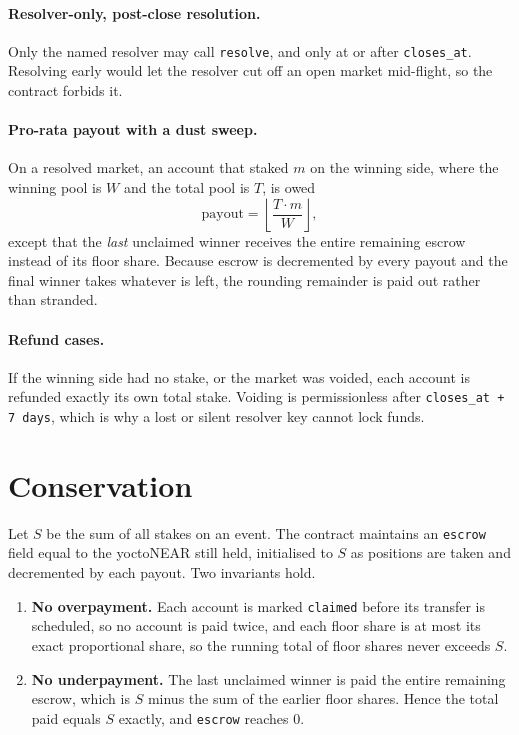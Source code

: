 \documentclass[11pt]{article}
\begin{document}
\paragraph{Resolver-only, post-close resolution.} Only the named resolver may
call \texttt{resolve}, and only at or after \texttt{closes\_at}. Resolving early
would let the resolver cut off an open market mid-flight, so the contract forbids
it.

\paragraph{Pro-rata payout with a dust sweep.} On a resolved market, an account
that staked $m$ on the winning side, where the winning pool is $W$ and the total
pool is $T$, is owed
\[
  \text{payout} = \left\lfloor \frac{T \cdot m}{W} \right\rfloor,
\]
except that the \emph{last} unclaimed winner receives the entire remaining
escrow instead of its floor share. Because escrow is decremented by every payout
and the final winner takes whatever is left, the rounding remainder is paid out
rather than stranded.

\paragraph{Refund cases.} If the winning side had no stake, or the market was
voided, each account is refunded exactly its own total stake. Voiding is
permissionless after \texttt{closes\_at + 7\,days}, which is why a lost or silent
resolver key cannot lock funds.

\section{Conservation}

Let $S$ be the sum of all stakes on an event. The contract maintains an
\texttt{escrow} field equal to the yoctoNEAR still held, initialised to $S$ as
positions are taken and decremented by each payout. Two invariants hold.

\begin{enumerate}
\item \textbf{No overpayment.} Each account is marked \texttt{claimed} before its
transfer is scheduled, so no account is paid twice, and each floor share is at
most its exact proportional share, so the running total of floor shares never
exceeds $S$.
\item \textbf{No underpayment.} The last unclaimed winner is paid the entire
remaining escrow, which is $S$ minus the sum of the earlier floor shares. Hence
the total paid equals $S$ exactly, and \texttt{escrow} reaches $0$.
\end{enumerate}
\end{document}
